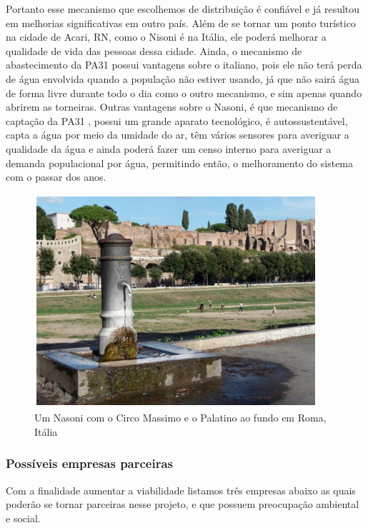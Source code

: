     Portanto esse mecanismo que escolhemos de distribuição é confiável e já resultou em melhorias significativas em outro país. Além de se tornar um ponto turístico na cidade de Acari, RN, como o Nisoni é na Itália, ele poderá melhorar a qualidade de vida das pessoas dessa cidade. Ainda, o mecanismo de abastecimento da PA31 possui vantagens sobre o italiano, pois ele não terá perda de água envolvida quando a população não estiver usando, já que não sairá água de forma livre durante todo o dia como o outro mecanismo, e sim apenas quando abrirem as torneiras. Outras vantagens sobre o Nasoni, é que mecanismo de captação da PA31 , possui um grande aparato tecnológico, é autossustentável, capta a água por meio da umidade do ar, têm vários sensores para averiguar a qualidade da água e ainda poderá fazer um censo interno para averiguar a demanda populacional por água, permitindo então, o melhoramento do sistema com o passar dos anos.
    \FloatBarrier
	\begin{figure}[!htbp]
      \centering
      \includegraphics[scale=1]{editaveis/figuras/nasoni_italia}
      \caption[Um Nasoni com o Circo Massimo e o Palatino ao fundo em Roma, Itália ]
      {Um Nasoni com o Circo Massimo e o Palatino ao fundo em Roma, Itália  \cite{rodrigues}}
      \label{dimensionamento_nasoni}
    \end{figure}
    \FloatBarrier
    \subsubsection{Possíveis empresas parceiras}
      
      Com a finalidade aumentar a viabilidade listamos três empresas abaixo as quais poderão se tornar parceiras nesse projeto, e que possuem preocupação ambiental e social.
      
